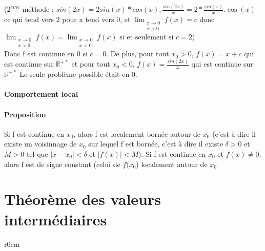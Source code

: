		($2^{eme}$ méthode : $sin(2x) = 2sin(x)*cos(x), \frac{sin(2x)}{x} = 2*\frac{sin(x)}{x}.\cos(x)$ ce qui tend vers 2 pour x tend vers 0, et $\lim_{\substack{x\to 0 \\  x > 0}} f(x) = c$ donc ~\\
		$\lim_{\substack{x\to 0 \\  x > 0}} f(x) = \lim_{\substack{x\to 0 \\  x<0}} f(x) \text{ si et seulement si } c =2$)
		~\\
		Donc f est continue en 0 si $c=0$. De plus, pour tout $x_0 > 0$, $f(x) = x+c$ qui est continue sur $\mathbb{R}^{+*}$ et pour tout $x_0 < 0$, $f(x) = \frac{sin(2x)}{x}$ qui est continue sur $\mathbb{R}^{-*}$
		Le seule problème possible était en 0.

\paragraph{Comportement local}
\paragraph{Proposition} Si f est continue en $x_0$, alors f est localement bornée autour de $x_0$ (c'est à dire il existe un voisinnage de $x_0$ sur lequel f est bornée, c'est à dire il existe $\delta > 0$ et $M > 0$ tel que $|x-x_0| < \delta$ et $|f(x)| < M$).
Si f est continue en $x_0$ et $f(x) \neq 0$, alors f est de signe constant (celui de $f(x_0$) localement autour de $x_0$

\section{Théorème des valeurs intermédiaires}


\begin{wrapfigure}[5]{r}{0cm}
\end{wrapfigure}
